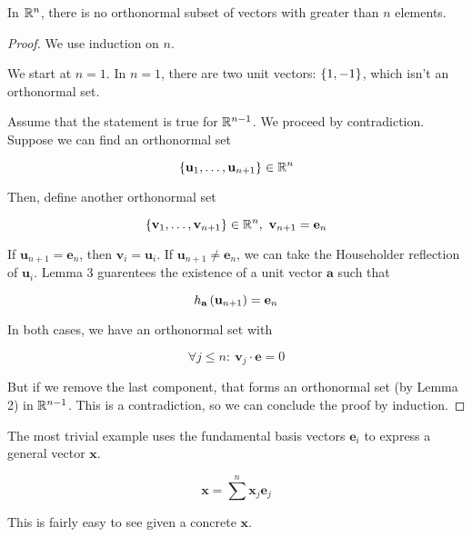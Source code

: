 \documentclass[11pt]{article}
\begin{document}
\begin{lemma}
  
  In $\mathbb R^n$, there is no orthonormal subset of vectors with greater than $n$ elements.

  \begin{proof}
    We use induction on $n$.

    We start at $n=1$.
    In $n=1$, there are two unit vectors: $\left \{ 1, -1 \right \}$, which isn't an orthonormal set.

    Assume that the statement is true for $\mathbb R^{n-1}$.
    We proceed by contradiction.
    Suppose we can find an orthonormal set
    
    $$
    \left \{ \textbf{u}_1, \dots, \textbf{u}_{n+1} \right \} \in \mathbb R^n
    $$
    
    Then, define another orthonormal set
    
    $$
    \left \{ \textbf{v}_1, \dots, \textbf{v}_{n+1}  \right \} \in \mathbb R^n,\ \textbf{v}_{n+1} = \textbf{e}_n
    $$

    If $\bm{u}_{n+1} = \bm{e}_n$, then $\bm{v}_i = \bm{u}_i$.
    If $\bm{u}_{n+1} \neq \bm{e}_n$, we can take the Householder reflection of $\bm{u}_i$.
    Lemma 3 guarentees the existence of a unit vector $\bm{a}$ such that
    
    $$
    h_{\textbf{a}} \left ( \textbf{u}_{n+1} \right) = \textbf{e}_n
    $$

    In both cases, we have an orthonormal set with
    
    $$
    \forall j \leq n:\ \bm{v}_j \cdot \bm{e} = 0
    $$

    But if we remove the last component, that forms an orthonormal set (by Lemma 2) in $\mathbb R^{n-1}$.
    This is a contradiction, so we can conclude the proof by induction.
  \end{proof}
\end{lemma}


\begin{example}
  
  The most trivial example uses the fundamental basis vectors $\bm{e}_i$ to express a general vector $\bm{x}$.

  $$
  \bm{x} = \sum^n \bm{x}_j \bm{e}_j
  $$

  This is fairly easy to see given a concrete $\bm{x}$.
\end{example}
\end{document}
